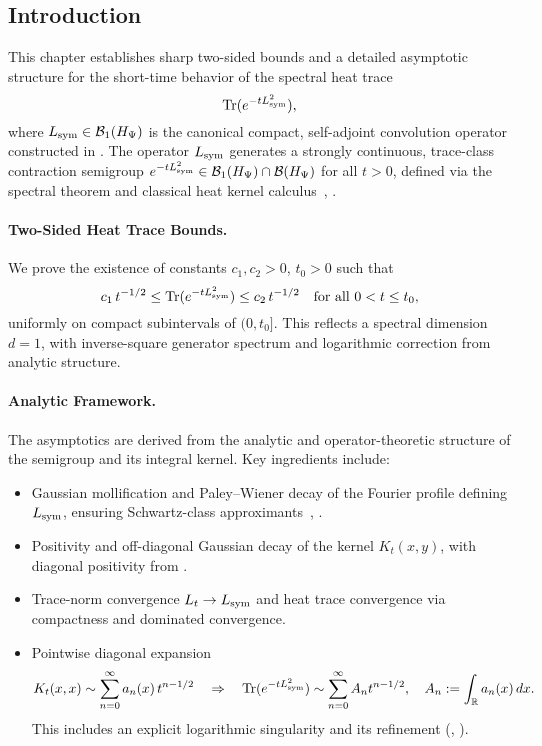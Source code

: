 \subsection*{Introduction}

This chapter establishes sharp two-sided bounds and a detailed asymptotic structure for the short-time behavior of the spectral heat trace
\[
\operatorname{Tr}(e^{-t L_{\mathrm{sym}}^2}),
\]
where \( L_{\mathrm{sym}} \in \mathcal{B}_1(H_{\Psi}) \) is the canonical compact, self-adjoint convolution operator constructed in . The operator \( L_{\mathrm{sym}} \) generates a strongly continuous, trace-class contraction semigroup \( e^{-tL_{\mathrm{sym}}^2} \in \mathcal{B}_1(H_{\Psi}) \cap \mathcal{B}(H_{\Psi}) \) for all \( t > 0 \), defined via the spectral theorem and classical heat kernel calculus~\cite[Ch.~X]{ReedSimon1978IV}, \cite[Ch.~3]{Simon2005TraceIdeals}.

\paragraph{Two-Sided Heat Trace Bounds.}
We prove the existence of constants \( c_1, c_2 > 0 \), \( t_0 > 0 \) such that
\[
c_1\, t^{-1/2} \le \operatorname{Tr}(e^{-t L_{\mathrm{sym}}^2}) \le c_2\, t^{-1/2}
\quad \text{for all } 0 < t \le t_0,
\]
uniformly on compact subintervals of \( (0, t_0] \). This reflects a spectral dimension \( d = 1 \), with inverse-square generator spectrum and logarithmic correction from analytic structure.

\paragraph{Analytic Framework.}
The asymptotics are derived from the analytic and operator-theoretic structure of the semigroup and its integral kernel. Key ingredients include:
\begin{itemize}
  \item Gaussian mollification and Paley--Wiener decay of the Fourier profile defining \( L_{\mathrm{sym}} \), ensuring Schwartz-class approximants~\cite[Ch.~IX]{ReedSimon1975II}, \cite[Ch.~9]{Levin1996EntireLectures}.
  \item Positivity and off-diagonal Gaussian decay of the kernel \( K_t(x, y) \), with diagonal positivity from .
  \item Trace-norm convergence \( L_t \to L_{\mathrm{sym}} \) and heat trace convergence via compactness and dominated convergence.
  \item Pointwise diagonal expansion
  \[
  K_t(x,x) \sim \sum_{n=0}^\infty a_n(x)\, t^{n - 1/2}
  \quad \Rightarrow \quad
  \operatorname{Tr}(e^{-t L_{\mathrm{sym}}^2}) \sim \sum_{n=0}^\infty A_n t^{n - 1/2},
  \quad A_n := \int_{\mathbb{R}} a_n(x)\,dx.
  \]
  This includes an explicit logarithmic singularity and its refinement (, ).
\end{itemize}

